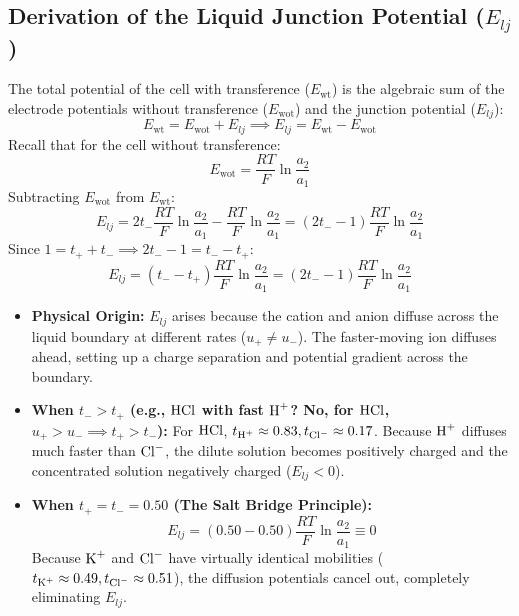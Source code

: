 \subsection{Derivation of the Liquid Junction Potential ($E_{lj}$)}
The total potential of the cell with transference ($E_{\text{wt}}$) is the algebraic sum of the electrode potentials without transference ($E_{\text{wot}}$) and the junction potential ($E_{lj}$):
\begin{equation}
    E_{\text{wt}} = E_{\text{wot}} + E_{lj} \implies \boxed{E_{lj} = E_{\text{wt}} - E_{\text{wot}}}
\end{equation}
Recall that for the cell without transference:
\begin{equation}
    E_{\text{wot}} = \frac{RT}{F} \ln \frac{a_2}{a_1}
\end{equation}
Subtracting $E_{\text{wot}}$ from $E_{\text{wt}}$:
\begin{equation}
    E_{lj} = 2 t_- \frac{RT}{F} \ln \frac{a_2}{a_1} - \frac{RT}{F} \ln \frac{a_2}{a_1} = (2t_- - 1) \frac{RT}{F} \ln \frac{a_2}{a_1}
\end{equation}
Since $1 = t_+ + t_- \implies 2t_- - 1 = t_- - t_+$:
\begin{equation}
    \boxed{E_{lj} = (t_- - t_+) \frac{RT}{F} \ln \frac{a_2}{a_1} = (2t_- - 1) \frac{RT}{F} \ln \frac{a_2}{a_1}}
\end{equation}

\begin{conceptbox}
\begin{itemize}[leftmargin=*]
    \item \textbf{Physical Origin:} $E_{lj}$ arises because the cation and anion diffuse across the liquid boundary at different rates ($u_+ \neq u_-$). The faster-moving ion diffuses ahead, setting up a charge separation and potential gradient across the boundary.
    \item \textbf{When $t_- > t_+$ (e.g., $\ce{HCl}$ with fast $\ce{H+}$? No, for $\ce{HCl}$, $u_+ > u_- \implies t_+ > t_-$):}
    For $\ce{HCl}$, $t_{\ce{H+}} \approx 0.83, t_{\ce{Cl-}} \approx 0.17$. Because $\ce{H+}$ diffuses much faster than $\ce{Cl-}$, the dilute solution becomes positively charged and the concentrated solution negatively charged ($E_{lj} < 0$).
    \item \textbf{When $t_+ = t_- = 0.50$ (The Salt Bridge Principle):}
    \begin{equation*}
        E_{lj} = (0.50 - 0.50) \frac{RT}{F} \ln \frac{a_2}{a_1} \equiv 0
    \end{equation*}
    Because $\ce{K+}$ and $\ce{Cl-}$ have virtually identical mobilities ($t_{\ce{K+}} \approx 0.49, t_{\ce{Cl-}} \approx 0.51$), the diffusion potentials cancel out, completely eliminating $E_{lj}$.
\end{itemize}
\end{conceptbox}

